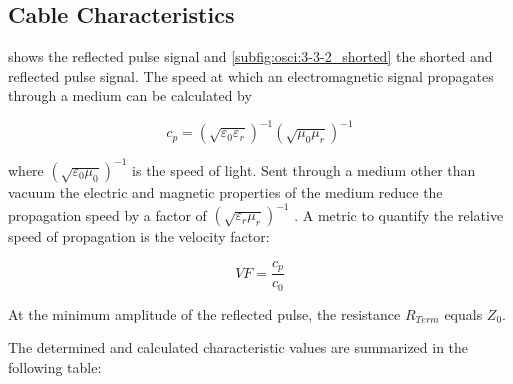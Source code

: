     \subsection{Cable Characteristics}
         shows the reflected pulse signal and \cref{subfig:osci:3-3-2_shorted} the shorted and reflected
        pulse signal. The speed at which an electromagnetic signal propagates through a medium can be calculated by\par
        \begin{equation}
            c_p = \left(\sqrt{\varepsilon_0\varepsilon_r}\right)^{-1} \left(\sqrt{\mu_0\mu_r}\right)^{-1}
        \end{equation}\par
        where \( \left(\sqrt{\varepsilon_0\mu_0}\right)^{-1} \) is the speed of light. Sent through a medium other than
        vacuum the electric and magnetic properties of the medium reduce the propagation speed by a factor of \( \left(\sqrt{\varepsilon_r\mu_r}\right)^{-1} \) \cite{Halliday.2005}.
        A metric to quantify the relative speed of propagation is the velocity factor:\par
        \begin{equation}
            VF = \frac{c_p}{c_0}
        \end{equation}\par
        At the minimum amplitude of the reflected pulse, the resistance \( R_{Term} \) equals \( Z_0 \).\par
        The determined and calculated characteristic values are summarized in the following table:\par
